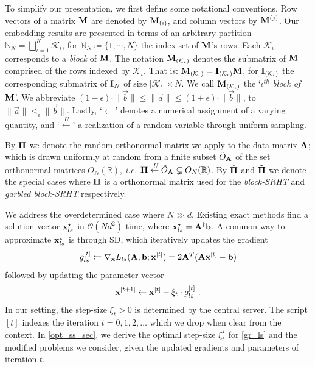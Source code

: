 \documentclass[journal,letterpaper,onecolumn,twoside,nofonttune]{IEEEtran}
\newcommand{\ow}{\mathcal{O}}
\newcommand{\K}{\mathcal{K}}
\newcommand{\Mb}{\bold{M}}
\newcommand{\Otil}{\tilde{O}}
\newcommand{\xb}{\bold{x}}
\newcommand{\Pibold}{\bold{\Pi}}
\newcommand{\Pibh}{\hat{\Pibold}}
\newcommand{\Pibt}{\tilde{\Pibold}}
\newcommand{\R}{\mathbb{R}}
\newcommand{\N}{\mathbb{N}}
\newcommand{\Ab}{\bold{A}}
\newcommand{\bb}{\bold{b}}
\newcommand{\Ib}{\bold{I}}
\newcommand{\getsU}{\overset{\ U}{\gets}}
\begin{document}
To simplify our presentation, we first define some notational conventions. Row vectors of a matrix $\Mb$ are denoted by $\Mb_{(i)}$, and column vectors by $\Mb^{(j)}$. Our embedding results are presented in terms of an arbitrary partition $\N_N=\bigsqcup_{\iota=1}^K\K_\iota$, for $\N_N\coloneqq\{1,\cdots,N\}$ the index set of $\Mb$'s rows. Each $\K_\iota$ corresponds to a \textit{block} of $\Mb$. The notation $\Mb_{(\K_\iota)}$ denotes the submatrix of $\Mb$ comprised of the rows indexed by $\K_\iota$. That is: $\Mb_{(\K_\iota)}=\Ib_{(\K_\iota)}\Mb$, for $\Ib_{(\K_\iota)}$ the corresponding submatrix of $\Ib_N$ of size $|\K_\iota|\times N$. We call $\Mb_{(\K_\iota)}$ the `$\iota^{th}$ \textit{block of} $\Mb$'. We abbreviate $(1-\epsilon)\cdot\|\vec{b}\|\leqslant\|\vec{a}\|\leqslant(1+\epsilon)\cdot\|\vec{b}\|$, to $\|\vec{a}\|\leqslant_\epsilon\|\vec{b}\|$. Lastly, `$\gets$' denotes a numerical assignment of a varying quantity, and `$\getsU$' a realization of a random variable through uniform sampling.

By $\Pibold$ we denote the random orthonormal matrix we apply to the data matrix $\Ab$; which is drawn uniformly at random from a finite subset $\Otil_\Ab$ of the set orthonormal matrices $O_N(\R)$, \textit{i.e.} $\Pibold\getsU \Otil_\Ab\subsetneq O_N(\R)$. By $\Pibh$ and $\Pibt$ we denote the special cases where $\Pibold$ is a orthonormal matrix used for the \textit{block-SRHT} and \textit{garbled block-SRHT} respectively.

We address the overdetermined case where $N\gg d$. Existing exact methods find a solution vector $\xb_{ls}^{\star}$ in $\ow(Nd^2)$ time, where $\xb_{ls}^{\star}=\Ab^{\dagger}\bb$. A common way to approximate $\xb_{ls}^{\star}$ is through SD, which iteratively updates the gradient
\begin{equation}
\label{gr_ls}
  g_{ls}^{[t]}\coloneqq\nabla_{\xb}L_{ls}(\Ab,\bb;\xb^{[t]}) = 2\Ab^T(\Ab\xb^{[t]}-\bb)
\end{equation}
followed by updating the parameter vector
\begin{equation}
\label{par_upd}
  \xb^{[t+1]}\gets\xb^{[t]}-\xi_t\cdot g_{ls}^{[t]}\ .
\end{equation}
In our setting, the step-size $\xi_t>0$ is determined by the central server. The script $[t]$ indexes the iteration $t=0,1,2,\ldots$ which we drop when clear from the context. In \ref{opt_ss_sec}, we derive the optimal step-size $\xi_t^{\star}$ for \eqref{gr_ls} and the modified problems we consider, given the updated gradients and parameters of iteration $t$.
\end{document}
